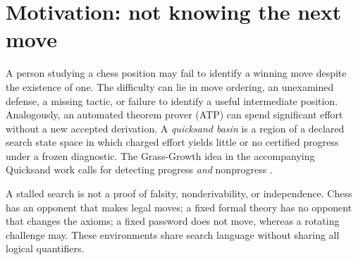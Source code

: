 \documentclass[11pt,letterpaper]{article}
\theoremstyle{remark}
\begin{document}
\section{Motivation: not knowing the next move}
A person studying a chess position may fail to identify a winning move despite the existence of one. The difficulty can lie in move ordering, an unexamined defense, a missing tactic, or failure to identify a useful intermediate position. Analogously, an automated theorem prover (ATP) can spend significant effort without a new accepted derivation. A \emph{quicksand basin} is a region of a declared search state space in which charged effort yields little or no certified progress under a frozen diagnostic. The Grass-Growth idea in the accompanying Quicksand work calls for detecting progress \emph{and} nonprogress \cite{quicksand}.

A stalled search is not a proof of falsity, nonderivability, or independence. Chess has an opponent that makes legal moves; a fixed formal theory has no opponent that changes the axioms; a fixed password does not move, whereas a rotating challenge may. These environments share search language without sharing all logical quantifiers.
\end{document}
